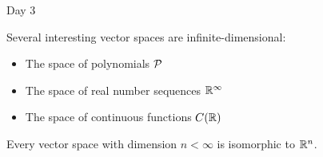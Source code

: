 \begin{applicationActivities}{Day 3}
\begin{observation}
  Several interesting vector spaces are infinite-dimensional:
  \begin{itemize}
    \item The space of polynomials \(\P\)
    \item The space of real number sequences \(\IR^\infty\)
    \item The space of continuous functions \(C(\IR)\)
  \end{itemize}
\end{observation}

\begin{fact}
  Every vector space with dimension \(n<\infty\) is isomorphic to \(\IR^n\).
\end{fact}

\end{applicationActivities}
